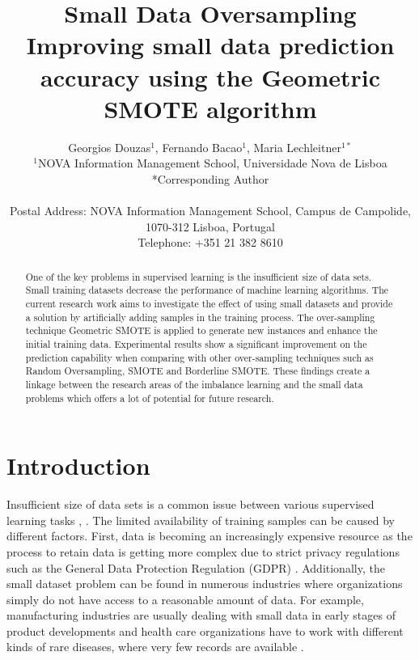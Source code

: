 \documentclass[parskip=full]{scrartcl}
\title{Small Data Oversampling  \\ \LARGE{Improving small data prediction accuracy using the Geometric SMOTE algorithm}}
\author{
	Georgios Douzas\(^{1}\), Fernando Bacao\(^{1}\), Maria Lechleitner\(^{1*}\) 
	\\
	\small{\(^{1}\)NOVA Information Management School, Universidade Nova de Lisboa}
	\\
	\small{*Corresponding Author}
	\\
	\\
	\small{Postal Address: NOVA Information Management School, Campus de Campolide, 1070-312 Lisboa, Portugal}
	\\
	\small{Telephone: +351 21 382 8610}
}
\date{}
\begin{document}
\maketitle

\begin{abstract}
One of the key problems in supervised learning is the insufficient size of data sets. Small training 
datasets decrease the performance of machine learning algorithms. The current research work aims to 
investigate the effect of using small datasets and provide a solution by artificially adding samples in the 
training process. The over-sampling technique Geometric SMOTE is applied to generate new instances 
and enhance the initial training data. Experimental results show a significant improvement on the 
prediction capability when comparing with other over-sampling techniques such as Random 
Oversampling, SMOTE and Borderline SMOTE. These findings create a linkage between the research 
areas of the imbalance learning and the small data problems which offers a lot of potential for future
research.
\end{abstract}

\section{Introduction}
Insufficient size of data sets is a common issue between various supervised learning tasks 
\cite{Niyogi.1998}, \cite{AbdulLateh.2017}. The limited availability of training samples can be caused by 
different factors. First, data is becoming an increasingly expensive resource \cite{Li.2007} as the 
process to retain data is getting more complex due to strict privacy regulations such as the General 
Data Protection Regulation (GDPR) \cite{EuropeanCommission.2019}. Additionally, the small dataset 
problem can be found in numerous industries where organizations simply do not have access to a 
reasonable amount of data. For example, manufacturing industries are usually dealing with small data in 
early stages of product developments and health care organizations have to work with different kinds 
of rare diseases, where very few records are available \cite{AbdulLateh.2017}.
\end{document}
